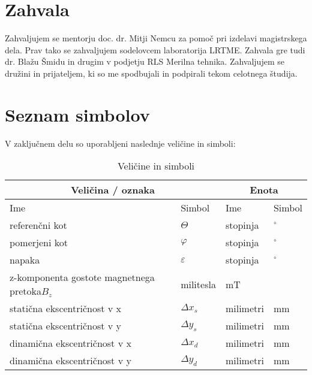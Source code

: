 \documentclass[a4paper,twoside,openright,12pt]{book}
\date{Ljubljana, 2018}
\begin{document}
\frontmatter
%
%
\maketitle
%
%
\chapter*{Zahvala}
Zahvaljujem se mentorju doc. dr. Mitji Nemcu za pomoč pri izdelavi magistrskega dela. Prav tako se zahvaljujem sodelovcem laboratorija LRTME.
Zahvala gre tudi dr. Blažu Šmidu in drugim v podjetju RLS Merilna tehnika.
Zahvaljujem se družini in prijateljem, ki so me spodbujali in podpirali tekom celotnega študija.
%
%
\tableofcontents
%
%
%
\chapter*{Seznam simbolov}
V zaključnem delu so uporabljeni naslednje veličine in
simboli:
%
\begin{table}[h]
\centering
\begin{tabular}{l l l l}
 \hline \multicolumn{2}{c}{\bf{Veličina / oznaka}} & \multicolumn{2}{c}{\bf{Enota}}  \\
 \hline
Ime & Simbol & Ime & Simbol \\
 \hline
 referenčni kot & $\Theta$  & stopinja & $^\circ$ \\
 pomerjeni kot & $\varphi$  & stopinja & $^\circ$ \\
 napaka& $\varepsilon$& stopinja & $^\circ$ \\
 z-komponenta gostote magnetnega pretoka$B_z$& militesla & mT \\
 statična ekscentričnost v x&$\Delta x_s$& milimetri & mm \\
 statična ekscentričnost v y&$\Delta y_s$& milimetri & mm \\
 dinamična ekscentričnost v x&$\Delta x_d$& milimetri & mm \\
 dinamična ekscentričnost v y&$\Delta y_d$& milimetri & mm \\
  \hline
\end{tabular}
  \caption{Veličine in simboli}
  \label{prebojne_trdnosti}
\end{table}
%
%
%
%
\mainmatter
%
%
\end{document}
